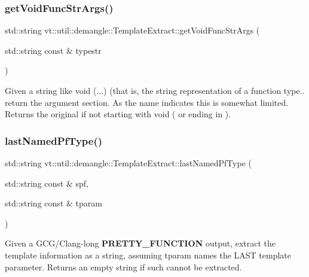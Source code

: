 \subsubsection{\texorpdfstring{get\+Void\+Func\+Str\+Args()}{getVoidFuncStrArgs()}}
{\footnotesize\ttfamily std\+::string vt\+::util\+::demangle\+::\+Template\+Extract\+::get\+Void\+Func\+Str\+Args (\begin{DoxyParamCaption}\item[{std\+::string const \&}]{typestr }\end{DoxyParamCaption})\hspace{0.3cm}{\ttfamily [static]}}

Given a string like \textquotesingle{}void (...)\textquotesingle{} (that is, the string representation of a function type.. return the argument section. As the name indicates this is somewhat limited. Returns the original if not starting with \textquotesingle{}void (\textquotesingle{} or ending in \textquotesingle{})\textquotesingle{}. \mbox{\label{structvt_1_1util_1_1demangle_1_1_template_extract_a8fe842098a300f5b31f5ab1b0a76804b}} 
\subsubsection{\texorpdfstring{last\+Named\+Pf\+Type()}{lastNamedPfType()}}
{\footnotesize\ttfamily std\+::string vt\+::util\+::demangle\+::\+Template\+Extract\+::last\+Named\+Pf\+Type (\begin{DoxyParamCaption}\item[{std\+::string const \&}]{spf,  }\item[{std\+::string const \&}]{tparam }\end{DoxyParamCaption})\hspace{0.3cm}{\ttfamily [static]}}

Given a G\+C\+G/\+Clang-\/long {\bfseries P\+R\+E\+T\+T\+Y\+\_\+\+F\+U\+N\+C\+T\+I\+ON} output, extract the template information as a string, assuming tparam names the L\+A\+ST template parameter. Returns an empty string if such cannot be extracted. \mbox{\label{structvt_1_1util_1_1demangle_1_1_template_extract_a544c77a181038fc1de063fe3d3fc761d}} 
